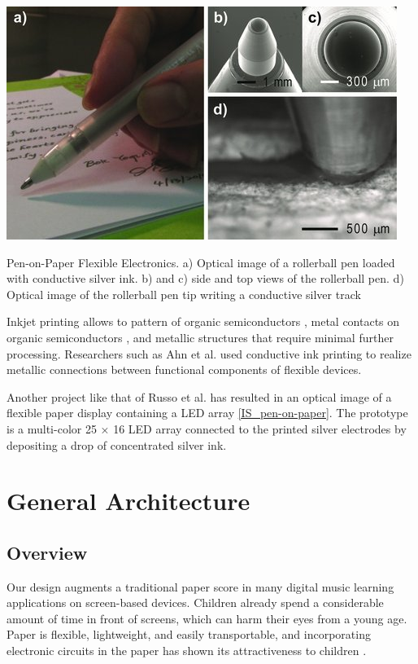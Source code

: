 \begin{marginfigure}
   \centering
   \includegraphics{images/IS_pen-on-paper.jpg}
   \caption{Pen-on-Paper Flexible Electronics. a) Optical image of a rollerball pen loaded with conductive silver ink. b) and c) side and top views of the rollerball pen. d) Optical image of the rollerball pen tip writing a conductive silver track}
   \label{fig:IS_pen-on-paper}
\end{marginfigure}

Inkjet printing allows to pattern of organic semiconductors \cite{kim2008heterogeneous}, metal contacts on organic semiconductors \cite{khan2019soft} \cite{wessely2020sprayable}, and metallic structures that require minimal further processing. Researchers such as Ahn et al. used conductive ink printing to realize metallic connections between functional components of flexible devices.



Another project like that of Russo et al. \cite{russo2011pen} has resulted in an optical image of a flexible paper display containing a LED array \ref{IS_pen-on-paper}. The prototype is a multi-color 25 × 16 LED array connected to the printed silver electrodes by depositing a drop of concentrated silver ink.

\section{General Architecture}

\subsection{Overview}




Our design augments a traditional paper score in many digital music learning applications on screen-based devices. Children already spend a considerable amount of time in front of screens, which can harm their eyes from a young age. Paper is flexible, lightweight, and easily transportable, and incorporating electronic circuits in the paper has shown its attractiveness to children \cite{hershman2018light}. 

